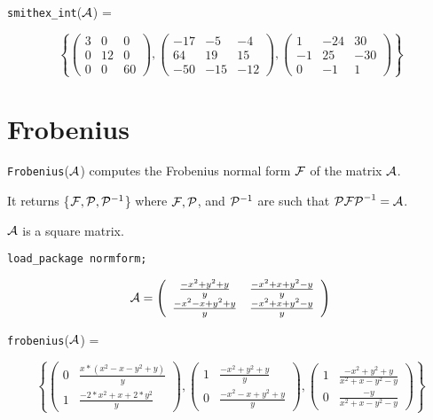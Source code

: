 {\tt smithex\_int}(${\cal A}$) =
\begin{center}
\begin{displaymath}
\left\{ \left( \begin{array}{ccc} 3 & 0 & 0 \\ 0 & 12 & 0 \\ 0 & 0 & 60
\end{array} \right), \left( \begin{array}{ccc} -17 & -5 & -4 \\ 64 & 19
& 15 \\ -50 & -15 & -12 \end{array} \right), \left( \begin{array}{ccc}
1 & -24 & 30 \\ -1 & 25 & -30 \\ 0 & -1 & 1 \end{array} \right) \right\}
\end{displaymath}
\end{center}


\section{Frobenius}

{\tt Frobenius}(${\cal A}$) computes the Frobenius normal form
${\cal F}$ of the matrix ${\cal A}$.

It returns \{${\cal F}, {\cal P}, {\cal P}^{-1}$\} where ${\cal F},
{\cal P}$, and ${\cal P}^{-1}$ are such that ${\cal P F P}^{-1} =
{\cal A}$.

${\cal A}$ is a square matrix.

{\tt load\_package normform;}

\begin{displaymath}
{\cal A} = \left( \begin{array}{cc} \frac{-x^2+y^2+y}{y} &
\frac{-x^2+x+y^2-y}{y} \\ \frac{-x^2-x+y^2+y}{y} & \frac{-x^2+x+y^2-y}
{y} \end{array} \right)
\end{displaymath}

{\tt frobenius}(${\cal A}$) =
\begin{center}
\begin{displaymath}
\left\{ \left( \begin{array}{cc} 0 & \frac{x*(x^2-x-y^2+y)}{y} \\ 1 &
\frac{-2*x^2+x+2*y^2}{y} \end{array} \right), \left( \begin{array}{cc}
1 & \frac{-x^2+y^2+y}{y} \\ 0 & \frac{-x^2-x+y^2+y}{y} \end{array}
\right), \left( \begin{array}{cc} 1 & \frac{-x^2+y^2+y}{x^2+x-y^2-y} \\
0 & \frac{-y}{x^2+x-y^2-y} \end{array} \right) \right\}
\end{displaymath}
\end{center}


